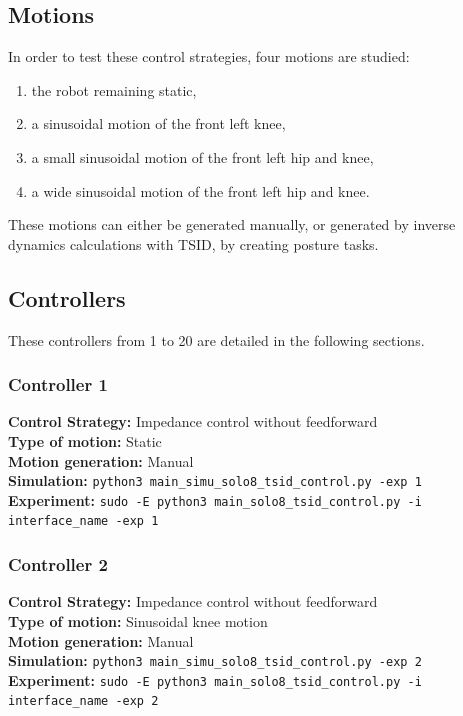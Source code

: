 \documentclass[12pt,a4paper]{article}
\begin{document}
\subsection{Motions}

In order to test these control strategies, four motions are studied: 
\begin{enumerate}
    \item the robot remaining static,
    \item a sinusoidal motion of the front left knee,
    \item a small sinusoidal motion of the front left hip and knee,
    \item a wide sinusoidal motion of the front left hip and knee.
\end{enumerate}
These motions can either be generated manually, or generated by inverse dynamics calculations with TSID, by creating posture tasks.

\subsection{Controllers}

These controllers from 1 to 20 are detailed in the following sections.

\subsubsection{Controller 1}

\textbf{Control Strategy:} Impedance control without feedforward \\
\textbf{Type of motion:} Static \\
\textbf{Motion generation:} Manual \\
\textbf{Simulation:} \texttt{python3 main\_simu\_solo8\_tsid\_control.py -exp 1} \\
\textbf{Experiment:} \texttt{sudo -E python3 main\_solo8\_tsid\_control.py -i interface\_name -exp 1} \\

\subsubsection{Controller 2}

\textbf{Control Strategy:} Impedance control without feedforward \\
\textbf{Type of motion:} Sinusoidal knee motion \\
\textbf{Motion generation:} Manual \\
\textbf{Simulation:} \texttt{python3 main\_simu\_solo8\_tsid\_control.py -exp 2} \\
\textbf{Experiment:} \texttt{sudo -E python3 main\_solo8\_tsid\_control.py -i interface\_name -exp 2} \\
\end{document}
